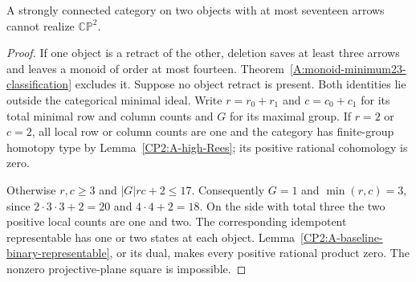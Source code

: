 \begin{proposition}
\label{CP2:A-baseline-strong-two}
A strongly connected category on two objects with at most
seventeen arrows cannot realize $\mathbb{CP}^2$.
\end{proposition}
\begin{proof}
If one object is a retract of the other, deletion saves
at least three arrows and leaves a monoid of order at most
fourteen.  Theorem~\ref{A:monoid-minimum23-classification}
excludes it.  Suppose no object retract is present.
Both identities lie outside the categorical minimal ideal.
Write $r=r_0+r_1$ and $c=c_0+c_1$ for its total minimal
row and column counts and $G$ for its maximal group.
If $r=2$ or $c=2$, all local row or column counts are one
and the category has finite-group homotopy type by
Lemma~\ref{CP2:A-high-Rees}; its positive rational
cohomology is zero.

Otherwise $r,c\geq3$ and $|G|rc+2\leq17$.
Consequently $G=1$ and $\min(r,c)=3$, since
$2\cdot3\cdot3+2=20$ and $4\cdot4+2=18$.
On the side with total three the two positive local
counts are one and two.  The corresponding idempotent
representable has one or two states at each object.
Lemma~\ref{CP2:A-baseline-binary-representable}, or its
dual, makes every positive rational product zero.
The nonzero projective-plane square is impossible.
\end{proof}

